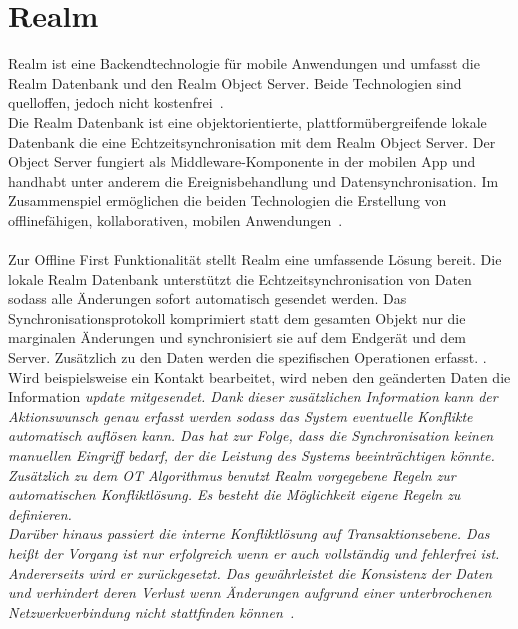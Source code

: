 \section{\label{sub:realm}Realm}
Realm ist eine Backendtechnologie für mobile Anwendungen und umfasst die Realm Datenbank und den Realm Object Server. Beide Technologien sind quelloffen, jedoch nicht kostenfrei~\cite{realm}.\\
Die Realm Datenbank ist eine objektorientierte, plattformübergreifende lokale Datenbank die eine Echtzeitsynchronisation mit dem Realm Object Server.
Der Object Server fungiert als \gls{Middleware}-Komponente in der mobilen \gls{App} und handhabt unter anderem die Ereignisbehandlung und Datensynchronisation. Im Zusammenspiel ermöglichen die beiden Technologien die Erstellung von offlinefähigen, kollaborativen, mobilen Anwendungen~\cite{realm_whitepaper}.\\\\
Zur Offline First Funktionalität stellt Realm eine umfassende Lösung bereit.
Die lokale Realm Datenbank unterstützt die Echtzeitsynchronisation von Daten sodass alle Änderungen sofort automatisch gesendet werden. Das Synchronisationsprotokoll komprimiert statt dem gesamten Objekt nur die marginalen Änderungen und synchronisiert sie auf dem Endgerät und dem Server. Zusätzlich zu den Daten werden die spezifischen Operationen erfasst. . 
Wird beispielsweise ein Kontakt bearbeitet, wird neben den geänderten Daten die Information \it{update} mitgesendet.
Dank dieser zusätzlichen Information kann der Aktionswunsch genau erfasst werden sodass das System eventuelle Konflikte automatisch auflösen kann. Das hat zur Folge, dass die Synchronisation keinen manuellen Eingriff bedarf, der die Leistung des Systems beeinträchtigen könnte.
Zusätzlich zu dem \gls{OT} Algorithmus benutzt Realm vorgegebene Regeln zur automatischen Konfliktlösung. Es besteht die Möglichkeit eigene Regeln zu definieren.\\
Darüber hinaus passiert die interne Konfliktlösung auf Transaktionsebene. Das heißt der Vorgang ist nur erfolgreich wenn er auch vollständig und fehlerfrei ist. Andererseits wird er zurückgesetzt. Das gewährleistet die Konsistenz der Daten und verhindert deren Verlust wenn Änderungen aufgrund einer unterbrochenen Netzwerkverbindung nicht stattfinden können~\cite{realm_offline_whitepaper}.